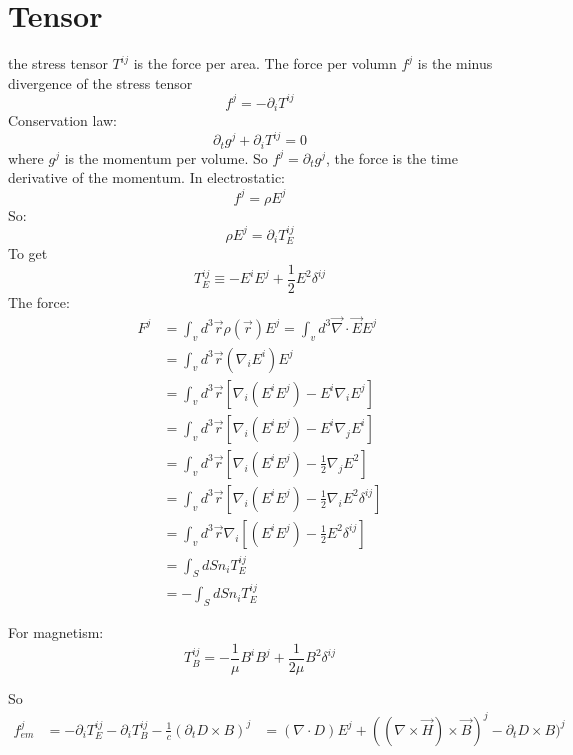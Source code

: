 \section{Tensor}
the stress tensor $T^{ij}$ is the force per area. The force per volumn $f^j$
is the minus divergence of the stress tensor
\[ f^j = -\partial_iT^{ij} \]
Conservation law:
\[  \partial_tg^j+\partial_iT^{ij} = 0 \]
where $g^j$ is the momentum per volume. So $f^j=\partial_tg^j$, the force is
the time derivative of the momentum.
In electrostatic:
\[  f^j = \rho E^j \]
So:
\[  \rho E^j = \partial_iT_E^{ij} \]
To get 
\[  T_E^{ij} \equiv -E^iE^j + \frac{1}{2}E^2\delta^{ij} \]
The force:
\begin{equation*}
\begin{aligned}  
    F^j &= \int_v d^3\vec{r}\rho(\vec{r})E^j = \int_v d^3\vec{\nabla}\cdot\vec{E}E^j	\\
	&= \int_v d^3\vec{r}(\nabla_iE^i)E^j \\
	&= \int_v d^3\vec{r} [\nabla_i(E^iE^j) - E^i\nabla_iE^j ] \\
	&= \int_v d^3\vec{r} [\nabla_i(E^iE^j) - E^i\nabla_jE^i ] \\
	&= \int_v d^3\vec{r} [\nabla_i(E^iE^j) - \frac{1}{2}\nabla_jE^2 ] \\
	&= \int_v d^3\vec{r} [\nabla_i(E^iE^j) - \frac{1}{2}\nabla_iE^2\delta^{ij} ] \\
	&= \int_v d^3\vec{r} \nabla_i [(E^iE^j) - \frac{1}{2}E^2\delta^{ij} ] \\
	&= \int_S dS n_i T_E^{ij} \\
	&= -\int_S dS n_i T_E^{ij} 
\end{aligned}  
\end{equation*}

For magnetism:
\[  T_B^{ij} = -\frac{1}{\mu}B^iB^j + \frac{1}{2\mu}B^2\delta^{ij} \]

So
\[
    \begin{aligned}
	f^j_{em} &= -\partial_iT_E^{ij} - \partial_iT_B^{ij} - \frac{1}{c}(\partial_tD\times B)^j
    &= (\nabla\cdot D)E^j + ((\nabla\times\vec{H})\times\vec{B})^j - \partial_tD\times B)^j 
    \end{aligned}
\]

